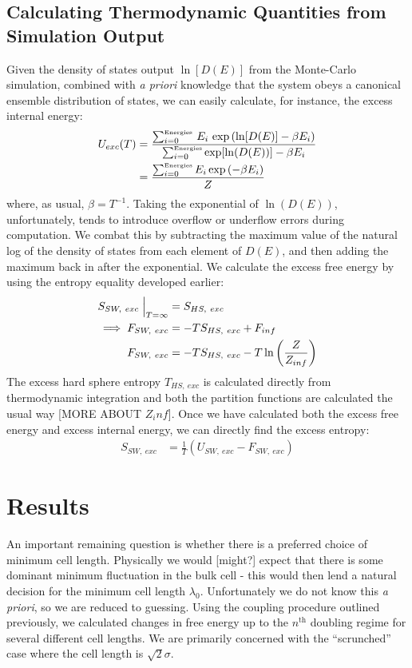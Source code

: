 \documentclass[12pt]{article}
\newcommand{\ignore}[1]{}
\begin{document}
\subsection{Calculating Thermodynamic Quantities from Simulation Output}
Given the density of states output $\ln[D(E)]$ from the Monte-Carlo simulation, combined with {\it a priori} knowledge that the system obeys a canonical ensemble distribution of states, we can easily calculate, for instance, the excess internal energy:
\begin{align*}
     U_{exc}(T) &= \frac{\sum_{i=0}^{\text{\tiny Energies}}\,E_i\, \exp\left(\ln[D(E)] - \beta E_i\right)}{\sum_{i=0}^{\text{\tiny Energies}} \exp[\ln(D(E))] - \beta E_i}\\
     &= \frac{\sum_{i=0}^{\text{\tiny Energies}} E_i \exp\left(-\beta E_i\right)}{Z}
\end{align*} 
where, as usual, $\beta = T^{-1}$. Taking the exponential of $\ln(D(E))$, unfortunately, tends to introduce overflow or underflow errors during computation. We combat this by subtracting the maximum value of the natural log of the density of states \ignore{subtracting maximum ought to make it more negative\dots} from each element of $D(E)$, and then adding the maximum back in after the exponential. We calculate the excess free energy by using the entropy equality developed earlier:
\begin{align*}
     S_{SW,~exc}\Bigm\lvert_{T=\infty} &= S_{HS,~exc}\\
     \implies F_{SW,~exc} &= -TS_{HS,~exc} + F_{inf}\\
     F_{SW,~exc} &= -TS_{HS,~exc} - T\ln\left(\frac{Z}{Z_{inf}}\right)
\end{align*} 
The excess hard sphere entropy $T_{HS,~exc}$ is calculated directly from thermodynamic integration and both the partition functions are calculated the usual way [MORE ABOUT $Z_inf$]. Once we have calculated both the excess free energy and excess internal energy, we can directly find the excess entropy:
\begin{align*}
    S_{SW, ~exc} &= \frac{1}{T}\left(U_{SW,~exc} - F_{SW,~exc} \right)
\end{align*}


\section{Results}
An important remaining question is whether there is a preferred choice of minimum cell length. Physically we would [might?] expect that there is some dominant minimum fluctuation in the bulk cell - this would then lend a natural decision for the minimum cell length $\lambda_0$. Unfortunately we do not know this {\it a priori}, so we are reduced to guessing. Using the coupling procedure outlined previously, we calculated changes in free energy up to the $n^{\text{th}}$ doubling regime for several different cell lengths. We are primarily concerned with the ``scrunched'' case where the cell length is $\sqrt2\sigma$.
\end{document}
